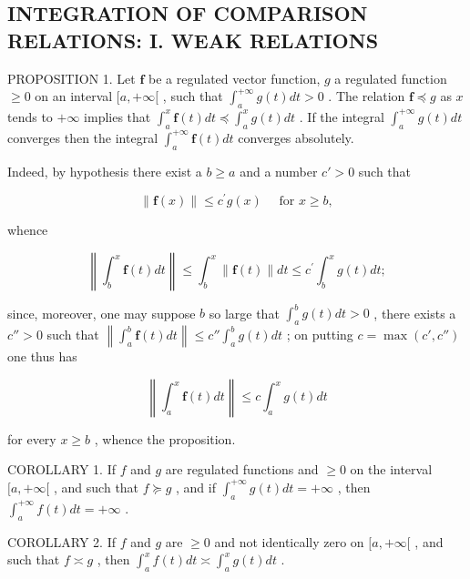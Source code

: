 \subsection{INTEGRATION OF COMPARISON RELATIONS: I. WEAK RELATIONS}

PROPOSITION 1. Let \(\mathbf{f}\) be a regulated vector function, \(g\) a regulated function \(\geqslant 0\) on an interval \([a, +\infty[\) , such that \(\int_{a}^{+\infty} g(t) dt > 0\) . The relation \(\mathbf{f} \preccurlyeq g\) as \(x\) tends to \(+\infty\) implies that \(\int_{a}^{x} \mathbf{f}(t) dt \preccurlyeq \int_{a}^{x} g(t) dt\) . If the integral \(\int_{a}^{+\infty} g(t) dt\) converges then the integral \(\int_{a}^{+\infty} \mathbf{f}(t) dt\) converges absolutely.

Indeed, by hypothesis there exist a \(b \geqslant a\) and a number \(c' > 0\) such that

\[
\| \mathbf {f} (x) \| \leqslant c ^ {\prime} g (x) \quad \text {   for   } x \geqslant b,
\]

whence

\[
\left\| \int_ {b} ^ {x} \mathbf {f} (t) d t \right\| \leqslant \int_ {b} ^ {x} \| \mathbf {f} (t) \| d t \leqslant c ^ {\prime} \int_ {b} ^ {x} g (t) d t;
\]

since, moreover, one may suppose \(b\) so large that \(\int_{a}^{b} g(t) dt > 0\) , there exists a \(c'' > 0\) such that \(\left\| \int_{a}^{b} \mathbf{f}(t) dt \right\| \leqslant c'' \int_{a}^{b} g(t) dt\) ; on putting \(c = \max(c', c'')\) one thus has

\[
\left\| \int_ {a} ^ {x} \mathbf {f} (t) d t \right\| \leqslant c \int_ {a} ^ {x} g (t) d t
\]

for every \(x \geqslant b\) , whence the proposition.

COROLLARY 1. If \(f\) and \(g\) are regulated functions and \(\geqslant 0\) on the interval \([a, +\infty[\) , and such that \(f \succcurlyeq g\) , and if \(\int_{a}^{+\infty} g(t) dt = +\infty\) , then \(\int_{a}^{+\infty} f(t) dt = +\infty\) .

COROLLARY 2. If \(f\) and \(g\) are \(\geqslant 0\) and not identically zero on \([a, +\infty[\) , and such that \(f \asymp g\) , then \(\int_{a}^{x} f(t) dt \asymp \int_{a}^{x} g(t) dt\) .

